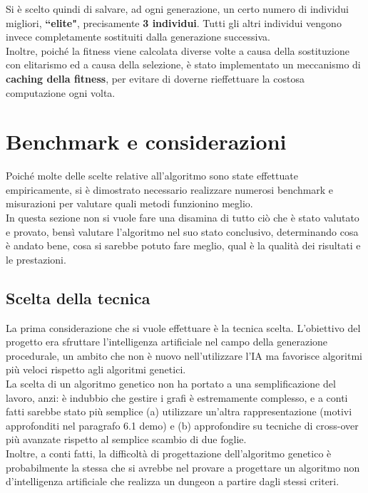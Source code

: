\documentclass[12pt,titlepage]{article}
\begin{document}
\noindent Si è scelto quindi di salvare, ad ogni generazione, un certo numero di individui migliori, \textbf{``elite"}, precisamente \textbf{3 individui}. Tutti gli altri individui vengono invece completamente sostituiti dalla generazione successiva.\\

\noindent Inoltre, poiché la fitness viene calcolata diverse volte a causa della sostituzione con elitarismo ed a causa della selezione, è stato implementato un meccanismo di \textbf{caching della fitness}, per evitare di doverne rieffettuare la costosa computazione ogni volta.

\section{Benchmark e considerazioni}

Poiché molte delle scelte relative all'algoritmo sono state effettuate empiricamente, si è dimostrato necessario realizzare numerosi benchmark e misurazioni per valutare quali metodi funzionino meglio.\\

\noindent In questa sezione non si vuole fare una disamina di tutto ciò che è stato valutato e provato, bensì valutare l'algoritmo nel suo stato conclusivo, determinando cosa è andato bene, cosa si sarebbe potuto fare meglio, qual è la qualità dei risultati e le prestazioni.

\subsection {Scelta della tecnica}

La prima considerazione che si vuole effettuare è la tecnica scelta. L'obiettivo del progetto era sfruttare l'intelligenza artificiale nel campo della generazione procedurale, un ambito che non è nuovo nell'utilizzare l'IA ma favorisce algoritmi più veloci rispetto agli algoritmi genetici.\\

\noindent La scelta di un algoritmo genetico non ha portato a una semplificazione del lavoro, anzi: è indubbio che gestire i grafi è estremamente complesso, e a conti fatti sarebbe stato più semplice (a) utilizzare un'altra rappresentazione (motivi approfonditi nel paragrafo 6.1 demo) e (b) approfondire su tecniche di cross-over più avanzate rispetto al semplice scambio di due foglie.\\

\noindent Inoltre, a conti fatti, la difficoltà di progettazione dell'algoritmo genetico è probabilmente la stessa che si avrebbe nel provare a progettare un algoritmo non d'intelligenza artificiale che realizza un dungeon a partire dagli stessi criteri.
\end{document}
